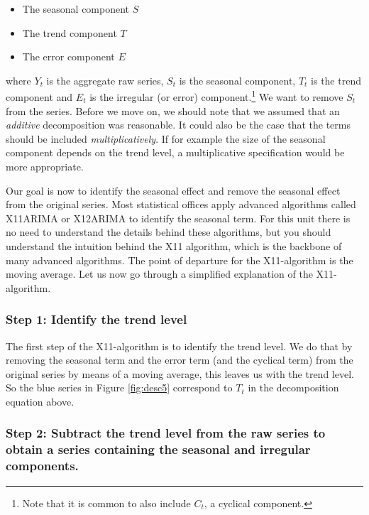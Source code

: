 \documentclass[
]{book}
\providecommand{\tightlist}{%
  \setlength{\itemsep}{0pt}\setlength{\parskip}{0pt}}
\begin{document}
\begin{itemize}
\tightlist
\item
  The seasonal component \(S\)
\item
  The trend component \(T\)
\item
  The error component \(E\)
\end{itemize}

where \(Y_t\) is the aggregate raw series, \(S_t\) is the seasonal component, \(T_t\) is the trend component and \(E_t\) is the irregular (or error) component.\footnote{Note that it is common to also include \(C_t\), a cyclical component.} We want to remove \(S_t\) from the series. Before we move on, we should note that we assumed that an \emph{additive} decomposition was reasonable. It could also be the case that the terms should be included \emph{multiplicatively}. If for example the size of the seasonal component depends on the trend level, a multiplicative specification would be more appropriate.

Our goal is now to identify the seasonal effect and remove the seasonal effect from the original series. Most statistical offices apply advanced algorithms called X11ARIMA or X12ARIMA to identify the seasonal term. For this unit there is no need to understand the details behind these algorithms, but you should understand the intuition behind the X11 algorithm, which is the backbone of many advanced algorithms. The point of departure for the X11-algorithm is the moving average. Let us now go through a simplified explanation of the X11-algorithm.

\hypertarget{step-1-identify-the-trend-level}{%
\subsubsection*{Step 1: Identify the trend level}\label{step-1-identify-the-trend-level}}

The first step of the X11-algorithm is to identify the trend level. We do that by removing the seasonal term and the error term (and the cyclical term) from the original series by means of a moving average, this leaves us with the trend level. So the blue series in Figure \ref{fig:desc5} correspond to \(T_t\) in the decomposition equation above.

\hypertarget{step-2-subtract-the-trend-level-from-the-raw-series-to-obtain-a-series-containing-the-seasonal-and-irregular-components.}{%
\subsubsection*{Step 2: Subtract the trend level from the raw series to obtain a series containing the seasonal and irregular components.}\label{step-2-subtract-the-trend-level-from-the-raw-series-to-obtain-a-series-containing-the-seasonal-and-irregular-components.}}
\end{document}
